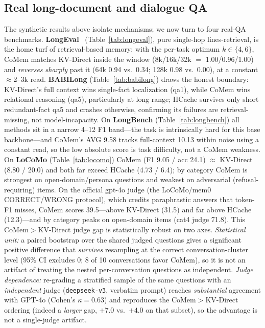

\subsection{Real long-document and dialogue QA}
The synthetic results above isolate mechanisms; we now turn to four real-QA
benchmarks. \textbf{LongEval}~\citep{longeval} (Table~\ref{tab:longeval}), pure single-hop
lines-retrieval, is the home turf of retrieval-based memory: with the per-task
optimum $k{\in}\{4,6\}$, CoMem matches KV-Direct inside the window
(8k/16k/32k $=$ 1.00/0.96/1.00) and \emph{reverses sharply} past it (64k 0.94
vs.\ 0.34; 128k 0.98 vs.\ 0.00), at a constant $\approx$2--3k read.
\textbf{BABILong} (Table~\ref{tab:babilong}) draws the honest boundary:
KV-Direct's full context wins single-fact localization (qa1), while CoMem wins
relational reasoning (qa5), particularly at long range; HCache survives only
short redundant-fact qa5 and crashes otherwise, confirming its failures are
retrieval-missing, not model-incapacity. On \textbf{LongBench}
(Table~\ref{tab:longbench}) all methods sit in a narrow 4--12 F1 band---the task
is intrinsically hard for this base backbone---and CoMem's AVG 9.58 tracks
full-context 10.13 within noise using a constant read, so the low absolute score
is task difficulty, not a CoMem weakness. On \textbf{LoCoMo}
(Table~\ref{tab:locomo}) CoMem (F1 9.05 / acc 24.1) $\approx$ KV-Direct
(8.80 / 20.0) and both far exceed HCache (4.73 / 6.4); by category CoMem is
strongest on open-domain/persona questions and weakest on adversarial
(refusal-requiring) items. On the official gpt-4o judge (the LoCoMo/mem0
CORRECT/WRONG protocol), which credits paraphrastic answers that token-F1 misses,
CoMem scores 39.5---above KV-Direct (31.5) and far above HCache (12.3)---and by
category peaks on open-domain items (cat4 judge 71.8). This CoMem$>$KV-Direct
judge gap is statistically robust on two axes. \emph{Statistical unit:} a paired
bootstrap over the shared judged questions gives a significant positive
difference that \emph{survives} resampling at the correct conversation-cluster
level (95\% CI excludes 0; 8 of 10 conversations favor CoMem), so it is not an
artifact of treating the nested per-conversation questions as independent.
\emph{Judge dependence:} re-grading a stratified sample of the same questions
with an \emph{independent} judge (\texttt{deepseek-v3}, verbatim prompt) reaches
\emph{substantial} agreement with GPT-4o (Cohen's $\kappa{=}0.63$) and reproduces
the CoMem$>$KV-Direct ordering (indeed a \emph{larger} gap, $+7.0$ vs.\ $+4.0$ on
that subset), so the advantage is not a single-judge artifact.

